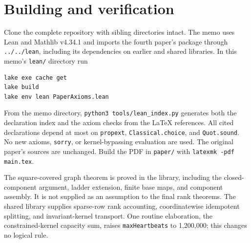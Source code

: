 \section{Building and verification}\label{sec:verification}
Clone the complete repository with sibling directories intact. The memo
uses Lean and Mathlib v4.34.1 and imports the fourth paper's package through
\texttt{../../lean}, including its dependencies on earlier and shared libraries.
In this memo's \texttt{lean/} directory run
\begin{verbatim}
lake exe cache get
lake build
lake env lean PaperAxioms.lean
\end{verbatim}
From the memo directory, \texttt{python3 tools/lean\_index.py} generates
both the declaration index and the axiom checks from the LaTeX references.
All cited declarations depend at most on \texttt{propext},
\texttt{Classical.choice}, and \texttt{Quot.sound}. No new axioms,
\texttt{sorry}, or kernel-bypassing evaluation are used. The original
paper's sources are unchanged. Build the PDF in \texttt{paper/} with
\texttt{latexmk -pdf main.tex}.

The square-covered graph theorem is proved in the library, including
the closed-component argument, ladder extension, finite base maps, and
component assembly. It is not supplied as an assumption to the final
rank theorems. The shared library supplies sparse-row rank accounting,
coordinatewise idempotent splitting, and invariant-kernel transport.
One routine elaboration, the constrained-kernel capacity sum, raises
\texttt{maxHeartbeats} to 1,200,000; this changes no logical rule.
